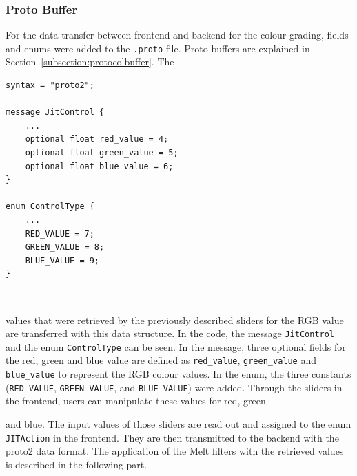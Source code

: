 \documentclass[../MasterThesis.tex]{subfiles}
\begin{document}
\subsubsection*{Proto Buffer}

For the data transfer between frontend and backend for the colour grading, fields and enums were added to the \texttt{.proto} file. Proto buffers are explained in Section~\ref{subsection:protocolbuffer}. The 
%
\begin{minipage}{0.54\textwidth}
\vspace*{-0.2em}
\begin{lstlisting}[style=protobufStyle, numbers=none]
syntax = "proto2";
	
message JitControl {
	...
	optional float red_value = 4;  
	optional float green_value = 5; 
	optional float blue_value = 6; 
}
	
enum ControlType {
	...
	RED_VALUE = 7;
	GREEN_VALUE = 8;
	BLUE_VALUE = 9;
}
\end{lstlisting}
\hfill
\end{minipage}\begin{minipage}{0.04\textwidth}
	\ 
\end{minipage}\begin{minipage}{0.42\textwidth}
\vspace*{0.7em}
values that were retrieved by the previously described sliders for the RGB value are transferred with this data structure.
In the code, the message \texttt{JitControl} and the enum \texttt{ControlType} can be seen. 
In the message, three optional fields for the red, green and blue value are defined as \texttt{red\_value}, \texttt{green\_value} and \texttt{blue\_value} to represent the RGB colour values. 
In the enum, the three constants (\texttt{RED\_VALUE}, \texttt{GREEN\_VALUE}, and \texttt{BLUE\_VALUE}) were added. 
Through the sliders in the frontend, users can manipulate these values for red, green

\end{minipage}

and blue. The input values of those sliders are read out and assigned to the enum \texttt{JITAction} in the frontend. They are then transmitted to the backend with the proto2 data format. The application of the Melt filters with the retrieved values is described in the following part.
\end{document}
